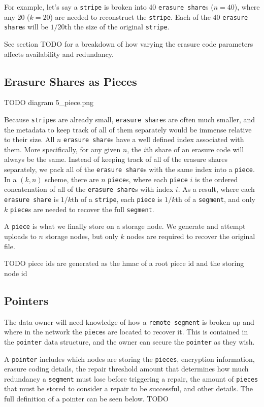 \documentclass[11pt,fleqn,openany]{book}
\newcommand{\x}[1]{{\tt #1}} \newcommand{\code}[1]{{\em #1}}
\newcommand{\todo}[1]{{\color{red} TODO #1 }}
\begin{document}
For example, let's say a \x{stripe} is broken into 40 \x{erasure share}s
($n=40$), where any 20 ($k=20$) are needed to reconstruct the \x{stripe}. Each
of the 40 \x{erasure share}s will be $1/20$th the size of the original
\x{stripe}.


See section \todo{} for a breakdown of how varying the erasure code parameters
affects availability and redundancy.

\subsection{Erasure Shares as Pieces}

\todo{diagram 5\_piece.png}

Because \x{stripe}s are already small, \x{erasure share}s are often much
smaller, and the metadata to keep track of all of them separately would be
immense relative to their size.
All $n$ \x{erasure share}s have a well defined index associated
with them. More specifically, for any given $n$, the $i$th share of an erasure
code will always be the same.
Instead of keeping track of all of the
erasure shares separately, we pack all of the \x{erasure share}s with the
same index into a \x{piece}.
In a $(k, n)$ scheme, there are $n$ \x{piece}s, where each
\x{piece} $i$ is the ordered concatenation of all of the \x{erasure share}s with
index $i$. As a result, where each \x{erasure share} is $1/k$th of a
\x{stripe}, each \x{piece} is $1/k$th of a \x{segment}, and only $k$
\x{piece}s are needed to recover the full \x{segment}.

A \x{piece} is what
we finally store on a storage node. We generate and attempt uploads to $n$
storage nodes, but only $k$ nodes are required to recover the original file.

\todo{piece ids are generated as the hmac of a root piece id and the storing
node id}

\subsection{Pointers}

The data owner will need knowledge of how a \x{remote segment} is broken up and
where in the network the \x{piece}s are located to recover it. This is contained
in the \x{pointer} data structure, and the owner can secure the \x{pointer} as
they wish.

A \x{pointer} includes which nodes are storing the \x{pieces},
encryption information, erasure coding details,
the repair threshold amount that determines how much redundancy a \x{segment}
must lose before triggering a repair, the amount of \x{pieces} that must be
stored to consider a repair to be successful, and other details. The full
definition of a pointer can be seen below. \todo{}
\end{document}
